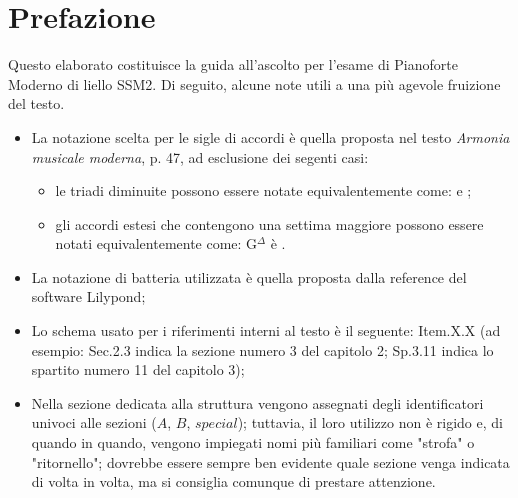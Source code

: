 \documentclass[class=book, crop=false, oneside, 12pt]{standalone}
\begin{document}
\chapter*{Prefazione}
Questo elaborato costituisce la guida all'ascolto per l'esame di Pianoforte Moderno di liello SSM2. Di seguito, alcune note utili a una più agevole fruizione del testo.

\begin{itemize}
    \item La notazione scelta per le sigle di accordi è quella proposta nel testo \emph{Armonia musicale moderna}, p. 47, ad esclusione dei segenti casi:
    \begin{itemize}
        \item le triadi diminuite possono essere notate equivalentemente come:  e ;
        \item gli accordi estesi che contengono una settima maggiore possono essere notati equivalentemente come: G\(^\Delta\) è .
    \end{itemize}
    \item La notazione di batteria utilizzata è quella proposta dalla reference del software Lilypond\cite{res:lily-drum-chart};
    \item Lo schema usato per i riferimenti interni al testo è il seguente: Item.X.X (ad esempio: Sec.2.3 indica la sezione numero 3 del capitolo 2; Sp.3.11 indica lo spartito numero 11 del capitolo 3);
    \item Nella sezione dedicata alla struttura vengono assegnati degli identificatori univoci alle sezioni (\(A\), \(B\), \(special\)); tuttavia, il loro utilizzo non è rigido e, di quando in quando, vengono impiegati nomi più familiari come "strofa" o "ritornello"; dovrebbe essere sempre ben evidente quale sezione venga indicata di volta in volta, ma si consiglia comunque di prestare attenzione.
\end{itemize}
\end{document}
